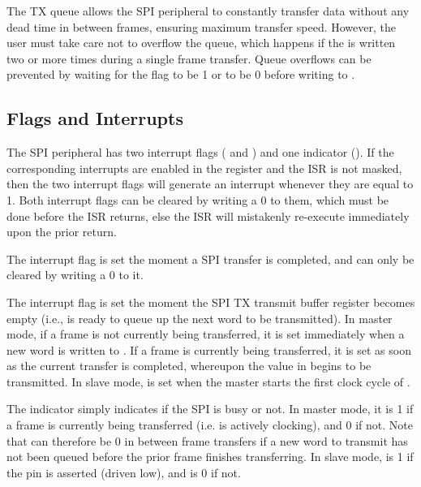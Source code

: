 The TX queue allows the SPI peripheral to constantly transfer data without any dead time in between frames, ensuring maximum transfer speed. However, the user must take care not to overflow the queue, which happens if the  is written two or more times during a single frame transfer. Queue overflows can be prevented by waiting for the  flag to be 1 or  to be 0 before writing to .


\subsection{Flags and Interrupts}

The SPI peripheral has two interrupt flags ( and ) and one indicator (). If the corresponding interrupts are enabled in the  register and the  ISR is not masked, then the two interrupt flags will generate an interrupt whenever they are equal to 1. Both interrupt flags can be cleared by writing a 0 to them, which must be done before the  ISR returns, else the ISR will mistakenly re-execute immediately upon the prior return.

The  interrupt flag is set the moment a SPI transfer is completed, and can only be cleared by writing a 0 to it.

The  interrupt flag is set the moment the SPI TX transmit buffer register  becomes empty (i.e., is ready to queue up the next word to be transmitted). In master mode, if a frame is not currently being transferred, it is set immediately when a new word is written to . If a frame is currently being transferred, it is set as soon as the current transfer is completed, whereupon the value in  begins to be transmitted. In slave mode,  is set when the master starts the first clock cycle of .

The  indicator simply indicates if the SPI is busy or not. In master mode, it is 1 if a frame is currently being transferred (i.e.  is actively clocking), and 0 if not. Note that  can therefore be 0 in between frame transfers if a new word to transmit has not been queued before the prior frame finishes transferring. In slave mode,  is 1 if the  pin is asserted (driven low), and is 0 if not.

